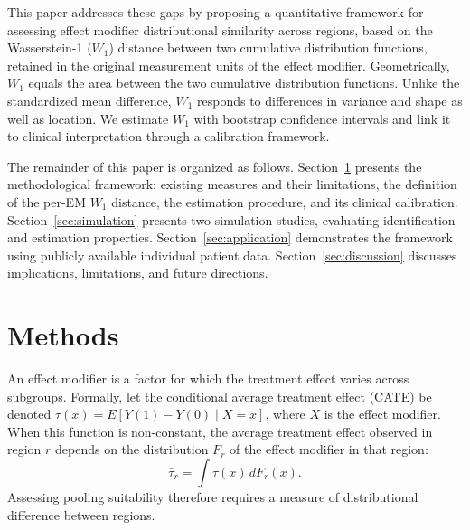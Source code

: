 \documentclass[AMA,Times1COL]{WileyNJDv5}
\begin{document}
This paper addresses these gaps by proposing a quantitative framework for assessing effect modifier distributional similarity across regions, based on the Wasserstein-1 ($W_1$) distance between two cumulative distribution functions, retained in the original measurement units of the effect modifier. Geometrically, $W_1$ equals the area between the two cumulative distribution functions. Unlike the standardized mean difference, $W_1$ responds to differences in variance and shape as well as location. We estimate $W_1$ with bootstrap confidence intervals and link it to clinical interpretation through a calibration framework.

The remainder of this paper is organized as follows. Section~\ref{sec:methods} presents the methodological framework: existing measures and their limitations, the definition of the per-EM $W_1$ distance, the estimation procedure, and its clinical calibration. Section~\ref{sec:simulation} presents two simulation studies, evaluating identification and estimation properties. Section~\ref{sec:application} demonstrates the framework using publicly available individual patient data. Section~\ref{sec:discussion} discusses implications, limitations, and future directions.

\section{Methods}\label{sec:methods}

An effect modifier is a factor for which the treatment effect varies across subgroups. Formally, let the conditional average treatment effect (CATE) be denoted $\tau(x) = E[Y(1) - Y(0) \mid X = x]$, where $X$ is the effect modifier. When this function is non-constant, the average treatment effect observed in region $r$ depends on the distribution $F_r$ of the effect modifier in that region:
\begin{equation}
\bar{\tau}_r = \int \tau(x) \, dF_r(x).
\label{eq:regional_ate}
\end{equation}
Assessing pooling suitability therefore requires a measure of distributional difference between regions.
\end{document}
